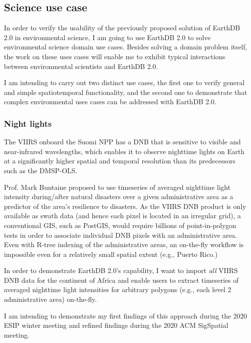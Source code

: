 \documentclass[letterpaper, parskip=half]{scrartcl}
\begin{document}
\newpage



\subsection{Science use case}
In order to verify the usability of the previously proposed solution of EarthDB 2.0 in environmental science, I am going to use EarthDB 2.0 to solve environmental science domain use cases. Besides solving a domain problem itself, the work on these uses cases will enable me to exhibit typical interactions between environmental scientists and EarthDB 2.0.

I am intending to carry out two distinct use cases, the first one to verify general and simple spatiotemporal functionality, and the second one to demonstrate that complex environmental uses cases can be addressed with EarthDB 2.0.

\subsubsection{Night lights}
The \gls{VIIRS} onboard the Suomi \gls{NPP} has a \gls{DNB} that is sensitive to visible and near-infrared wavelengths, which enables it to observe nighttime lights on Earth at a significantly higher spatial and temporal resolution than its predecessors such as the \gls{DMSP}-\gls{OLS}. 

Prof. Mark Buntaine proposed to use timeseries of averaged nighttime light intensity during/after natural disasters over a given administrative area as a predictor of the area's resilience to disasters. 
As the \gls{VIIRS} \gls{DNB} product is only available as swath data (and hence each pixel is located in an irregular grid), a conventional \gls{GIS}, such as PostGIS, would require billions of point-in-polygon tests in order to associate individual DNB pixels with an administrative area. Even with R-tree indexing of the administrative areas, an on-the-fly workflow is impossible even for a relatively small spatial extent (e.g., Puerto Rico.)

In order to demonstrate EarthDB 2.0's capability, I want to import \textit{all} \gls{VIIRS} \gls{DNB} data for the continent of Africa and enable users to extract timeseries of averaged nighttime light intensities for arbitrary polygons (e.g., each level 2 administrative area) on-the-fly. 

I am intending to demonstrate my first findings of this approach during the 2020 ESIP winter meeting and refined findings during the 2020 ACM SigSpatial meeting.
\end{document}
